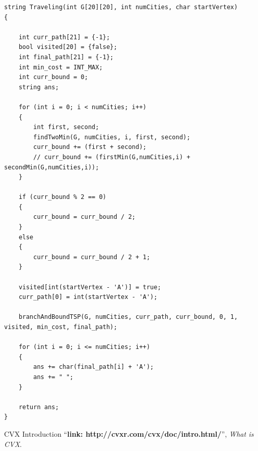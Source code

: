 \documentclass[a4paper]{article}
\begin{document}
\begin{verbatim}
string Traveling(int G[20][20], int numCities, char startVertex)
{

    int curr_path[21] = {-1};
    bool visited[20] = {false};
    int final_path[21] = {-1};
    int min_cost = INT_MAX;
    int curr_bound = 0;
    string ans;

    for (int i = 0; i < numCities; i++)
    {
        int first, second;
        findTwoMin(G, numCities, i, first, second);
        curr_bound += (first + second);
        // curr_bound += (firstMin(G,numCities,i) + secondMin(G,numCities,i));
    }

    if (curr_bound % 2 == 0)
    {
        curr_bound = curr_bound / 2;
    }
    else
    {
        curr_bound = curr_bound / 2 + 1;
    }

    visited[int(startVertex - 'A')] = true;
    curr_path[0] = int(startVertex - 'A');

    branchAndBoundTSP(G, numCities, curr_path, curr_bound, 0, 1, visited, min_cost, final_path);

    for (int i = 0; i <= numCities; i++)
    {
        ans += char(final_path[i] + 'A');
        ans += " ";
    }

    return ans;
}
\end{verbatim}
\begin{thebibliography}{80}

CVX Introduction
``\textbf{link: http://cvxr.com/cvx/doc/intro.html/}'',
\textit{What is CVX}.

\end{thebibliography}
\end{document}
